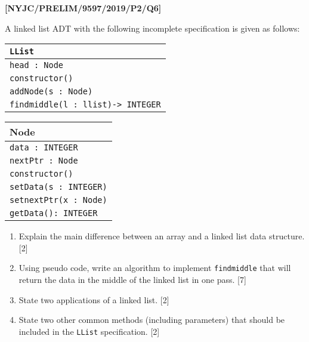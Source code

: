 \item \textbf{{[}NYJC/PRELIM/9597/2019/P2/Q6{]} }

A linked list ADT with the following incomplete specification is given
as follows:
\begin{center}
\begin{tabular}{|l|}
\hline 
\texttt{LList}\tabularnewline
\hline 
\texttt{head : Node}\tabularnewline
\hline 
\texttt{constructor()}\tabularnewline
\texttt{addNode(s : Node)}\tabularnewline
\texttt{findmiddle(l : llist)-> INTEGER}\tabularnewline
\hline 
\end{tabular}%
\begin{tabular}{|l|}
\hline 
Node\tabularnewline
\hline 
\texttt{data : INTEGER}\tabularnewline
\texttt{nextPtr : Node}\tabularnewline
\hline 
\texttt{constructor()}\tabularnewline
\texttt{setData(s : INTEGER)}\tabularnewline
\texttt{setnextPtr(x : Node)}\tabularnewline
\texttt{getData(): INTEGER }\tabularnewline
\hline 
\end{tabular}
\par\end{center}
\begin{enumerate}
\item Explain the main difference between an array and a linked list data
structure.\hfill{} {[}2{]}
\item Using pseudo code, write an algorithm to implement \texttt{findmiddle}
that will return the data in the middle of the linked list in one
pass. \hfill{}{[}7{]}
\item State two applications of a linked list. \hfill{}{[}2{]}
\item State two other common methods (including parameters) that should
be included in the \texttt{LList} specification.\hfill{} {[}2{]}
\end{enumerate}